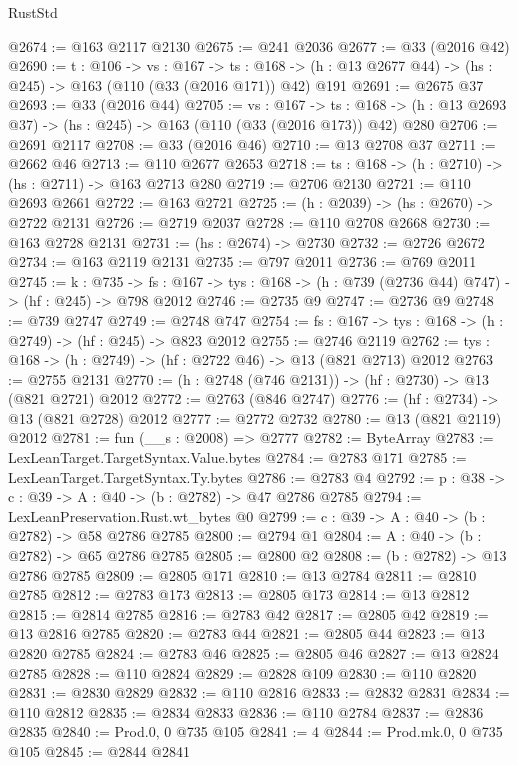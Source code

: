 \begin{lexlean}{RustStd}
\begin{coremodule}
@2674 := @163 @2117 @2130
@2675 := @241 @2036
@2677 := @33 (@2016 @42)
@2690 := {t : @106} ->
  {vs : @167} ->
  {ts : @168} -> (h : @13 @2677 @44) -> (hs : @245) -> @163 (@110 (@33 (@2016 @171)) @42) @191
@2691 := @2675 @37
@2693 := @33 (@2016 @44)
@2705 := {vs : @167} ->
  {ts : @168} -> (h : @13 @2693 @37) -> (hs : @245) -> @163 (@110 (@33 (@2016 @173)) @42) @280
@2706 := @2691 @2117
@2708 := @33 (@2016 @46)
@2710 := @13 @2708 @37
@2711 := @2662 @46
@2713 := @110 @2677 @2653
@2718 := {ts : @168} -> (h : @2710) -> (hs : @2711) -> @163 @2713 @280
@2719 := @2706 @2130
@2721 := @110 @2693 @2661
@2722 := @163 @2721
@2725 := (h : @2039) -> (hs : @2670) -> @2722 @2131
@2726 := @2719 @2037
@2728 := @110 @2708 @2668
@2730 := @163 @2728 @2131
@2731 := (hs : @2674) -> @2730
@2732 := @2726 @2672
@2734 := @163 @2119 @2131
@2735 := @797 @2011
@2736 := @769 @2011
@2745 := {k : @735} ->
  {fs : @167} -> {tys : @168} -> (h : @739 (@2736 @44) @747) -> (hf : @245) -> @798 @2012
@2746 := @2735 @9
@2747 := @2736 @9
@2748 := @739 @2747
@2749 := @2748 @747
@2754 := {fs : @167} -> {tys : @168} -> (h : @2749) -> (hf : @245) -> @823 @2012
@2755 := @2746 @2119
@2762 := {tys : @168} -> (h : @2749) -> (hf : @2722 @46) -> @13 (@821 @2713) @2012
@2763 := @2755 @2131
@2770 := (h : @2748 (@746 @2131)) -> (hf : @2730) -> @13 (@821 @2721) @2012
@2772 := @2763 (@846 @2747)
@2776 := (hf : @2734) -> @13 (@821 @2728) @2012
@2777 := @2772 @2732
@2780 := @13 (@821 @2119) @2012
@2781 := fun (__s : @2008) => @2777
@2782 := ByteArray
@2783 := LexLeanTarget.TargetSyntax.Value.bytes
@2784 := @2783 @171
@2785 := LexLeanTarget.TargetSyntax.Ty.bytes
@2786 := @2783 @4
@2792 := {p : @38} -> {c : @39} -> {A : @40} -> (b : @2782) -> @47 @2786 @2785
@2794 := LexLeanPreservation.Rust.wt_bytes @0
@2799 := {c : @39} -> {A : @40} -> (b : @2782) -> @58 @2786 @2785
@2800 := @2794 @1
@2804 := {A : @40} -> (b : @2782) -> @65 @2786 @2785
@2805 := @2800 @2
@2808 := (b : @2782) -> @13 @2786 @2785
@2809 := @2805 @171
@2810 := @13 @2784
@2811 := @2810 @2785
@2812 := @2783 @173
@2813 := @2805 @173
@2814 := @13 @2812
@2815 := @2814 @2785
@2816 := @2783 @42
@2817 := @2805 @42
@2819 := @13 @2816 @2785
@2820 := @2783 @44
@2821 := @2805 @44
@2823 := @13 @2820 @2785
@2824 := @2783 @46
@2825 := @2805 @46
@2827 := @13 @2824 @2785
@2828 := @110 @2824
@2829 := @2828 @109
@2830 := @110 @2820
@2831 := @2830 @2829
@2832 := @110 @2816
@2833 := @2832 @2831
@2834 := @110 @2812
@2835 := @2834 @2833
@2836 := @110 @2784
@2837 := @2836 @2835
@2840 := Prod.{0, 0} @735 @105
@2841 := 4
@2844 := Prod.mk.{0, 0} @735 @105
@2845 := @2844 @2841

\end{coremodule}
\end{lexlean}
